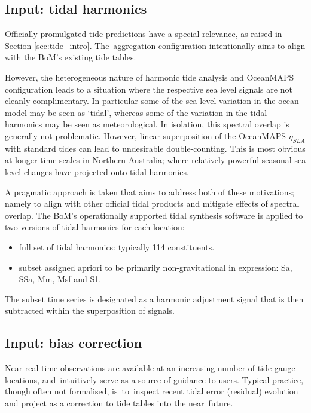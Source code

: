 \subsection{Input: tidal harmonics }
\label{sec:harmonics}
Officially promulgated tide predictions have a special relevance, as raised in Section \ref{sec:tide_intro}.
The~aggregation configuration intentionally aims to align with the BoM's existing tide tables. 

However, the heterogeneous nature of harmonic tide analysis and OceanMAPS configuration leads to a situation where the respective sea level signals are not cleanly complimentary.
In particular some of the sea level variation in the ocean model may be seen as `tidal', whereas some of the variation in the tidal harmonics may be seen as meteorological.   
In isolation, this spectral overlap is generally not problematic. 
However, linear superposition of the OceanMAPS $\eta_{SLA}$ with standard tides can lead to undesirable double-counting. 
This is most obvious at longer time scales in Northern Australia; where relatively powerful seasonal sea level changes have projected onto tidal harmonics.


A pragmatic approach is taken that aims to address both of these motivations; namely to align with other official tidal products and mitigate effects of spectral overlap.
The BoM's operationally supported tidal synthesis software is applied to two versions of tidal harmonics for each location:
\begin{itemize}
  \item full set of tidal harmonics: typically 114 constituents.
  \item subset assigned apriori to be primarily non-gravitational in expression: Sa, SSa, Mm, Msf and S1.
\end{itemize}

The subset time series is designated as a harmonic adjustment signal that is then subtracted within the superposition of signals. 


\subsection{Input: bias correction}
\label{sec:bias}
Near real-time observations are available at an increasing number of tide gauge locations, and~intuitively serve as a source of guidance to users.
Typical practice, though often not formalised, is~to~inspect recent tidal error (residual) evolution and project as a correction to tide tables into the near~future.

